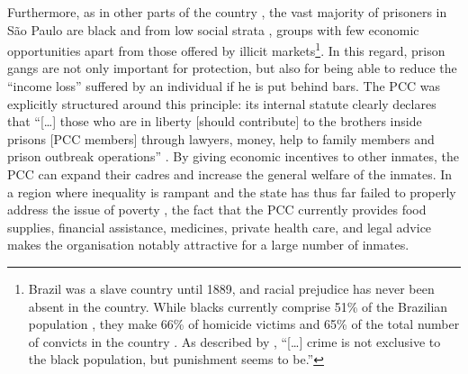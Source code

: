  Furthermore, as in other parts of the country \citep{zaluar1999debate}, the vast majority of prisoners in S\~{a}o Paulo are black and from low social strata \citep[16]{adorno2007organized}, groups with few economic opportunities apart from those offered by illicit markets\footnote{Brazil was a slave country until 1889, and racial prejudice has never been absent in the country. While blacks currently comprise 51\% of the Brazilian population \citep{secretariaassuntos2012populacaonegra}, they make 66\% of homicide victims and 65\% of the total number of convicts in the country \citep{waiselfisz2012mapa}. As described by \citet[1]{adorno1996racismo}, ``[\dots] crime is not exclusive to the black population, but punishment seems to be.''}. In this regard, prison gangs are not only important for protection, but also for being able to reduce the ``income loss'' suffered by an individual if he is put behind bars. The PCC was explicitly structured around this principle: its internal statute clearly declares that ``[\dots] those who are in liberty [should contribute] to the brothers inside prisons [PCC members] through lawyers, money, help to family members and prison outbreak operations'' \citep{folha2001estatutopcc}. By giving economic incentives to other inmates, the PCC can expand their cadres and increase the general welfare of the inmates. In a region where inequality is rampant and the state has thus far failed to properly address the issue of poverty \citep{chiavegatto2012cause, marques2012opportunities}, the fact that the PCC currently provides food supplies, financial assistance, medicines, private health care, and legal advice \citep{defesanet2012estatutopcc} makes the organisation notably attractive for a large number of inmates. 

